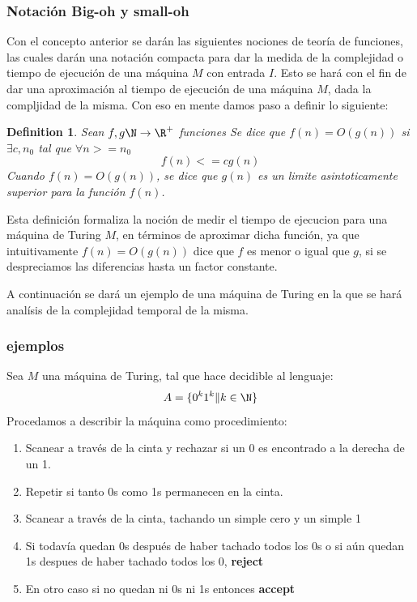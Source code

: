 \documentclass[10pt]{report}
\newtheorem{definition}{Definition}
\begin{document}
    \subsubsection{Notación Big-oh y small-oh}
    Con el concepto anterior se darán las siguientes nociones de teoría de funciones, las cuales darán una notación
    compacta para dar la medida de la complejidad o tiempo de ejecución de una máquina $M$ con entrada $I$.
    Esto se hará con el fin de dar una aproximación al tiempo de ejecución de una máquina $M$, dada la compljidad de la
    misma.
    \hfill
    Con eso en mente damos paso a definir lo siguiente:
    \begin{definition}
        Sean $f,g\N\rightarrow\R^+$ funciones\hfill
        Se dice que $f(n) = O(g(n))$ \hfill
        si $\exists c, n_{0}$ tal que $\forall n >= n_{0}$
        \begin{equation}
            f(n) <= cg(n)\label{eq:equation6}
        \end{equation}
        Cuando $f(n) = O(g(n))$, se dice que $g(n)$ es un limite asintoticamente superior
        para la función $f(n)$.
    \end{definition}
    Esta definición formaliza la noción de medir el tiempo de ejecucion para una máquina de Turing $M$, en términos
    de aproximar dicha función, ya que intuitivamente $f(n) = O(g(n)) $ dice que $f$ es menor o igual que $g$, si se
    despreciamos las diferencias hasta un factor constante.

    A continuación se dará un ejemplo de una máquina de Turing en la que se hará analísis de la complejidad temporal
    de la misma.
    \subsubsection{ejemplos}
    Sea $M$ una máquina de Turing, tal que hace decidible al lenguaje:
    \begin{equation}
        A = \{0^{k}1^{k} \| k\in \N \}
    \end{equation}
    Procedamos a describir la máquina como procedimiento:
    \begin{enumerate}
        \item Scanear a través de la cinta y rechazar si un 0 es encontrado a la derecha de un 1.
        \item Repetir si tanto 0s como 1s permanecen en la cinta.
        \item     Scanear a través de la cinta, tachando un simple cero y un simple 1
        \item Si todavía quedan 0s después de haber tachado todos los 0s o si aún quedan 1s despues de haber tachado todos los 0, \textbf{reject}
        \item En otro caso si no quedan ni 0s ni 1s entonces \textbf{accept}
    \end{enumerate}
\end{document}
